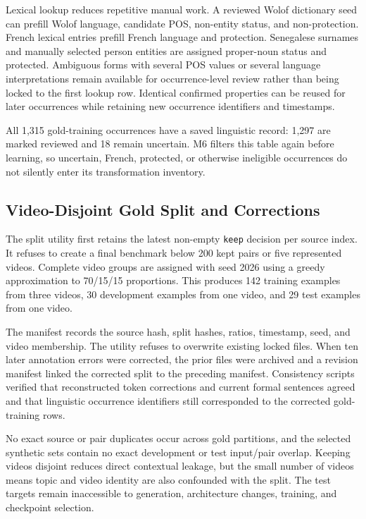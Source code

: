 \documentclass[12pt, a4paper, twoside, openany]{report}
\begin{document}
Lexical lookup reduces repetitive manual work. A reviewed Wolof dictionary seed can prefill Wolof language, candidate POS, non-entity status, and non-protection. French lexical entries prefill French language and protection. Senegalese surnames and manually selected person entities are assigned proper-noun status and protected. Ambiguous forms with several POS values or several language interpretations remain available for occurrence-level review rather than being locked to the first lookup row. Identical confirmed properties can be reused for later occurrences while retaining new occurrence identifiers and timestamps.

All 1,315 gold-training occurrences have a saved linguistic record: 1,297 are marked reviewed and 18 remain uncertain. M6 filters this table again before learning, so uncertain, French, protected, or otherwise ineligible occurrences do not silently enter its transformation inventory.


\subsection{Video-Disjoint Gold Split and Corrections}

The split utility first retains the latest non-empty \texttt{keep} decision per source index. It refuses to create a final benchmark below 200 kept pairs or five represented videos. Complete video groups are assigned with seed 2026 using a greedy approximation to 70/15/15 proportions. This produces 142 training examples from three videos, 30 development examples from one video, and 29 test examples from one video.

The manifest records the source hash, split hashes, ratios, timestamp, seed, and video membership. The utility refuses to overwrite existing locked files. When ten later annotation errors were corrected, the prior files were archived and a revision manifest linked the corrected split to the preceding manifest. Consistency scripts verified that reconstructed token corrections and current formal sentences agreed and that linguistic occurrence identifiers still corresponded to the corrected gold-training rows.

No exact source or pair duplicates occur across gold partitions, and the selected synthetic sets contain no exact development or test input/pair overlap. Keeping videos disjoint reduces direct contextual leakage, but the small number of videos means topic and video identity are also confounded with the split. The test targets remain inaccessible to generation, architecture changes, training, and checkpoint selection.
\end{document}
